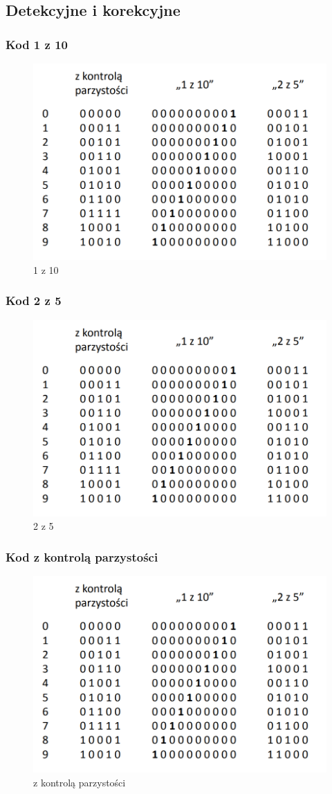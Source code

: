 \subsection{Detekcyjne i korekcyjne}

\subsubsection{Kod 1 z 10}

\begin{figure}[h!]
    \centering
    \includegraphics[width=.5\textwidth]{images/codes/detective.png}
    \caption{1 z 10}
    \label{fig:my_label}
\end{figure}

\newpage

\subsubsection{Kod 2 z 5}

\begin{figure}[h!]
    \centering
    \includegraphics[width=.5\textwidth]{images/codes/detective.png}
    \caption{2 z 5}
    \label{fig:my_label}
\end{figure}

\subsubsection{Kod z kontrolą parzystości}

\begin{figure}[h!]
    \centering
    \includegraphics[width=.5\textwidth]{images/codes/detective.png}
    \caption{z kontrolą parzystości}
    \label{fig:my_label}
\end{figure}

